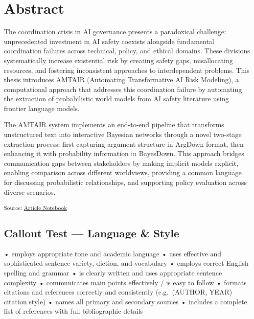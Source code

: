 \documentclass[12pt,a4paper]{report}      %
\begin{document}


\chapter*{Abstract}\label{abstract}

The coordination crisis in AI governance presents a paradoxical
challenge: unprecedented investment in AI safety coexists alongside
fundamental coordination failures across technical, policy, and ethical
domains. These divisions systematically increase existential risk by
creating safety gaps, misallocating resources, and fostering
inconsistent approaches to interdependent problems. This thesis
introduces AMTAIR (Automating Transformative AI Risk Modeling), a
computational approach that addresses this coordination failure by
automating the extraction of probabilistic world models from AI safety
literature using frontier language models.

The AMTAIR system implements an end-to-end pipeline that transforms
unstructured text into interactive Bayesian networks through a novel
two-stage extraction process: first capturing argument structure in
ArgDown format, then enhancing it with probability information in
BayesDown. This approach bridges communication gaps between stakeholders
by making implicit models explicit, enabling comparison across different
worldviews, providing a common language for discussing probabilistic
relationships, and supporting policy evaluation across diverse
scenarios.

\textsubscript{Source:
\href{https://VJMeyer.github.io/submission/thesis.qmd.html}{Article
Notebook}}

\section{Callout Test --- Language \&
Style}\label{callout-test-language-style}

• employs appropriate tone and academic language • uses effective and
sophisticated sentence variety, diction, and vocabulary • employs
correct English spelling and grammar • is clearly written and uses
appropriate sentence complexity • communicates main points effectively /
is easy to follow • formats citations and references correctly and
consistently (e.g.~(AUTHOR, YEAR) citation style) • names all primary
and secondary sources • includes a complete list of references with full
bibliographic details
\end{document}
